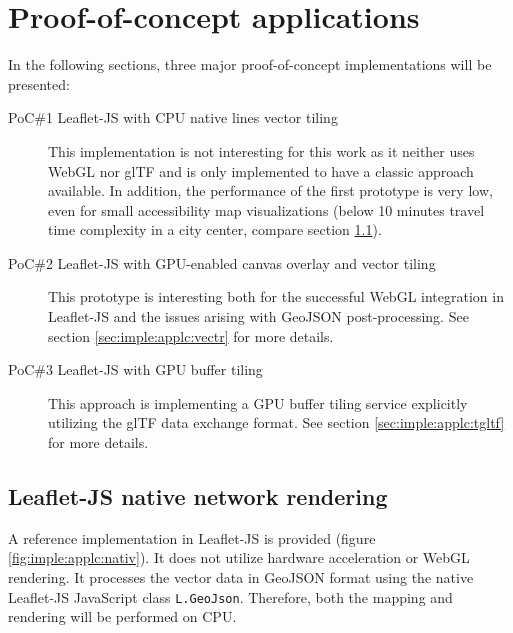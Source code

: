   \section{Proof-of-concept applications}
    \label{sec:imple:applc}
    In the following sections, three major proof-of-concept implementations will
    be presented:\par

    \begin{description}
      \item[PoC\#1 Leaflet-JS with CPU native lines vector
        tiling] This implementation is not interesting for
        this work as it neither uses WebGL nor glTF and is only implemented to
        have a classic approach available. In addition, the performance of the
        first prototype is very low, even for small accessibility map
        visualizations (below 10 minutes travel time complexity in a city
        center, compare section \ref{sec:imple:applc:nativ}).
      \item[PoC\#2 Leaflet-JS with GPU-enabled canvas overlay and vector tiling]
        This prototype is interesting both for the successful
        WebGL integration in Leaflet-JS and the issues arising with GeoJSON
        post-processing. See section \ref{sec:imple:applc:vectr} for more
        details.
      \item[PoC\#3 Leaflet-JS with GPU buffer tiling] This approach
        is implementing a GPU buffer tiling service explicitly utilizing the
        glTF data exchange format. See section \ref{sec:imple:applc:tgltf} for
        more details.
    \end{description}

    \subsection{Leaflet-JS native network rendering}
      \label{sec:imple:applc:nativ}
      A reference implementation in Leaflet-JS is provided (figure
      \ref{fig:imple:applc:nativ}). It does not utilize hardware acceleration or
      WebGL rendering. It processes the vector data in GeoJSON format using the
      native Leaflet-JS JavaScript class \texttt{L.GeoJson}. Therefore, both the
      mapping and rendering will be performed on CPU.\par


